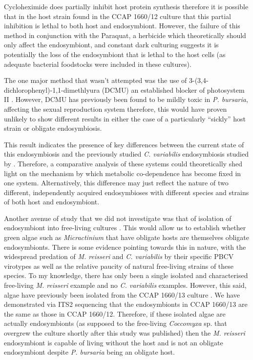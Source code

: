 Cycloheximide does partially inhibit host protein synthesis
\citep{weis1984effect,Kodama2007,Kodama2008,Kodama2009a}
therefore it is possible that in the host strain found in the
CCAP 1660/12 culture that this partial inhibition is lethal to both
host and endosymbiont. However, the failure of this method in conjunction
with the Paraquat, a herbicide which theoretically should only affect the endosymbiont, 
and constant dark culturing suggests it is potentially the loss of the endosymbiont
that is lethal to the host cells (as adequate bacterial
foodstocks were included in these cultures).   

The one major method that wasn't attempted was the use of 3-(3,4-dichlorophenyl)-1,1-dimethlyura (DCMU)
an established blocker of photosystem II \citep{VanGorkom1974}. 
However, DCMU has previously been found to be mildly toxic in \textit{P. bursaria}, 
affecting the sexual reproduction system \citep{Miwa2009} therefore, this would
have proven unlikely to show different results in either the case of a particularly 
``sickly'' host strain or obligate endosymbiosis. 


This result indicates the presence of key differences between the current state of this
endosymbiosis and the previously studied \textit{C. variabilis} endosymbiosis
studied by \citep{Kodama2014c}.  Therefore, a comparative analysis of these systems
could theoretically shed light on the mechanism by which metabolic co-dependence
has become fixed in one system. Alternatively, this difference may just reflect the nature of two
different, independently acquired endosymbioses with different species and strains
of both host and endosymbiont. 


Another avenue of study that we did not investigate was that of
isolation of endosymbiont into free-living cultures \citep{Achilles-Day2013a}. This would allow
us to establish whether green algae such as \textit{Micractinium} that have obligate
hosts are themselves obligate endosymbionts.  There is some evidence pointing
towards this in nature, with the widespread predation of \textit{M. reisseri}
and \textit{C. variabilis} by their specific PBCV virotypes as well as the relative
paucity of natural free-living strains of these species.  To my knowledge, there
has only been a single isolated and characterised free-living \textit{M. reisseri} \citep{Abou-Shanab2014}
example and no \textit{C. variabilis} examples.  However,
this said, algae have previously been isolated from the CCAP 1660/13 culture \citep{Achilles-Day2013a}.
We have demonstrated via ITS2 sequencing that the endosymbionts in CCAP 1660/13 are the same
as those in CCAP 1660/12. Therefore, if these isolated algae are actually endosymbionts (as supposed
to the free-living \textit{Coccomyxa} sp. that overgrew the culture shortly after this study
was published) then the \textit{M. reisseri} endosymbiont is capable of living without
the host and is not an obligate endosymbiont despite \textit{P. bursaria} being an obligate host.  


